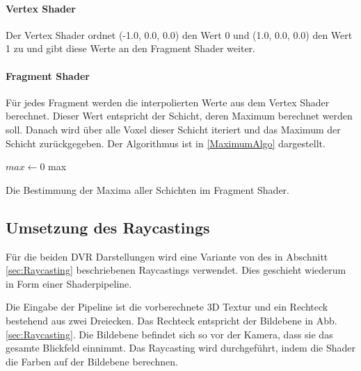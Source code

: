 \documentclass[a4paper,fontsize=12pt,toc=bib,halfparskip]{scrartcl}
\begin{document}
\paragraph{Vertex Shader}
Der Vertex Shader ordnet (-1.0, 0.0, 0.0) den Wert 0 und (1.0, 0.0, 0.0) den Wert 1 zu und gibt diese Werte an den Fragment Shader weiter.

\paragraph{Fragment Shader}
F\"ur jedes Fragment werden die interpolierten Werte aus dem Vertex Shader berechnet. Dieser Wert entspricht der Schicht, deren Maximum berechnet werden soll. Danach wird \"uber alle Voxel dieser Schicht iteriert und das Maximum der Schicht zur\"uckgegeben. Der Algorithmus ist in \ref{MaximumAlgo} dargestellt.

\begin{algorithm}
	
	$max \gets 0$\;
	\Return max\;
	\vspace{0.5cm}
	\caption{Die Bestimmung der Maxima aller Schichten im Fragment Shader.}
	\label{MaximumAlgo}
\end{algorithm}

\subsection{Umsetzung des Raycastings}
\label{RaycastingImplementation}

F\"ur die beiden DVR Darstellungen wird eine Variante von des in Abschnitt \ref{sec:Raycasting} beschriebenen Raycastings verwendet. Dies geschieht wiederum in Form einer Shaderpipeline.

Die Eingabe der Pipeline ist die vorberechnete 3D Textur und ein Rechteck bestehend aus zwei Dreiecken. Das Rechteck entspricht der Bildebene in Abb. \ref{sec:Raycasting}. Die Bildebene befindet sich so vor der Kamera, dass sie das gesamte Blickfeld einnimmt. Das Raycasting wird durchgef\"uhrt, indem die Shader die Farben auf der Bildebene berechnen.
\end{document}
